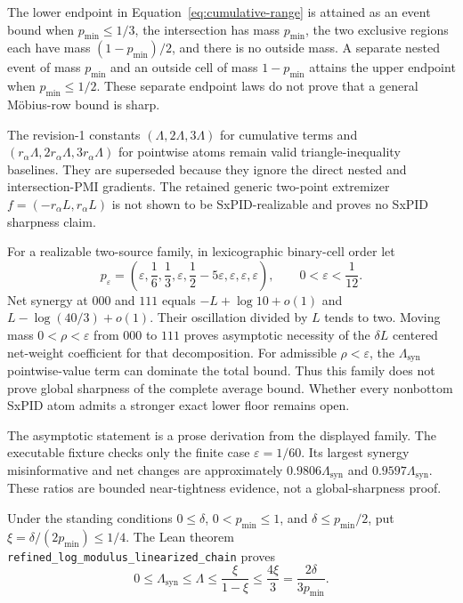 \documentclass[11pt]{article}
\theoremstyle{definition}
\begin{document}
	The lower endpoint in Equation~\eqref{eq:cumulative-range} is attained as an event bound when
	$p_{\min}\le1/3$, the intersection has mass $p_{\min}$, the two exclusive regions each have
	mass $(1-p_{\min})/2$, and there is no outside mass.  A separate nested event of mass
	$p_{\min}$ and an outside cell of mass $1-p_{\min}$ attains the upper endpoint when
	$p_{\min}\le1/2$.  These separate endpoint laws do not prove that a general M{\"o}bius-row bound
	is sharp.

	The revision-1 constants
	$(\Lambda,2\Lambda,3\Lambda)$ for cumulative terms and
	$(r_\alpha\Lambda,2r_\alpha\Lambda,3r_\alpha\Lambda)$ for pointwise atoms remain valid
	triangle-inequality baselines.  They are superseded because they ignore the direct nested and
	intersection-PMI gradients.  The retained generic two-point extremizer
	$f=(-r_\alpha L,r_\alpha L)$ is not shown to be SxPID-realizable and proves no SxPID sharpness
	claim.

For a realizable two-source family, in lexicographic binary-cell order let
\begin{equation}
  p_\varepsilon
  =
  \left(
    \varepsilon,\frac16,\frac13,\varepsilon,
    \frac12-5\varepsilon,\varepsilon,\varepsilon,\varepsilon
  \right),
  \qquad
  0<\varepsilon<\frac1{12}.
\end{equation}
Net synergy at $000$ and $111$ equals
$-L+\log 10+o(1)$ and $L-\log(40/3)+o(1)$.  Their oscillation divided by $L$ tends to two.
Moving mass $0<\rho<\varepsilon$ from $000$ to $111$ proves asymptotic necessity of the
$\delta L$ centered net-weight coefficient for that decomposition.  For admissible
	$\rho<\varepsilon$, the $\Lambda_{\mathrm{syn}}$ pointwise-value term can dominate the total
	bound.  Thus this family does not prove global sharpness of the complete average bound.
	Whether every nonbottom SxPID atom admits a stronger exact lower floor remains open.

	The asymptotic statement is a prose derivation from the displayed family.  The executable fixture
	checks only the finite case $\varepsilon=1/60$.  Its largest synergy misinformative and net
	changes are approximately $0.9806\Lambda_{\mathrm{syn}}$ and
	$0.9597\Lambda_{\mathrm{syn}}$.  These ratios are bounded near-tightness evidence, not a
	global-sharpness proof.

Under the standing conditions $0\le\delta$, $0<p_{\min}\le1$, and
$\delta\le p_{\min}/2$, put $\xi=\delta/(2p_{\min})\le1/4$.  The Lean theorem
\nolinkurl{refined_log_modulus_linearized_chain} proves
\begin{equation}\label{eq:linearized-modulus}
  0\le\Lambda_{\mathrm{syn}}\le\Lambda
  \le\frac{\xi}{1-\xi}
  \le\frac{4\xi}{3}
  =\frac{2\delta}{3p_{\min}}.
\end{equation}
\end{document}
